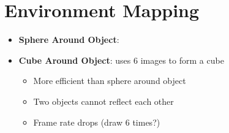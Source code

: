 \section{Environment Mapping}

  \begin{itemize}
    \item \textbf{Sphere Around Object}:
    \item \textbf{Cube Around Object}: uses 6 images to form a cube
    \begin{itemize}
      \item More efficient than sphere around object
      \item Two objects cannot reflect each other
      \item Frame rate drops (draw 6 times?)
    \end{itemize}
  \end{itemize}
